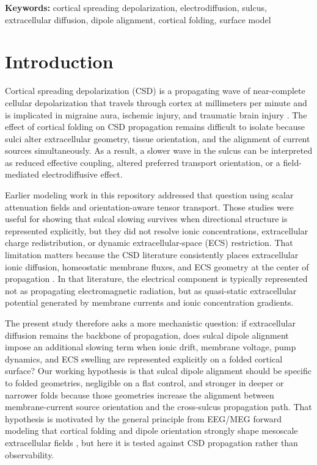 \documentclass[12pt]{article}
\begin{document}
\begin{abstract}
which extracellular diffusion remains the backbone of propagation, while sulcal dipole alignment adds a measurable, geometry-specific electrodiffusive slowing term that survives beyond the synthetic strip.
\end{abstract}

\noindent \textbf{Keywords:} cortical spreading depolarization, electrodiffusion, sulcus, extracellular diffusion, dipole alignment, cortical folding, surface model

\section{Introduction}

Cortical spreading depolarization (CSD) is a propagating wave of near-complete cellular depolarization that travels through cortex at millimeters per minute and is implicated in migraine aura, ischemic injury, and traumatic brain injury \citep{Pietrobon2014,Ayata2015,Woitzik2013,Dreier2017}. The effect of cortical folding on CSD propagation remains difficult to isolate because sulci alter extracellular geometry, tissue orientation, and the alignment of current sources simultaneously. As a result, a slower wave in the sulcus can be interpreted as reduced effective coupling, altered preferred transport orientation, or a field-mediated electrodiffusive effect.

Earlier modeling work in this repository addressed that question using scalar attenuation fields and orientation-aware tensor transport. Those studies were useful for showing that sulcal slowing survives when directional structure is represented explicitly, but they did not resolve ionic concentrations, extracellular charge redistribution, or dynamic extracellular-space (ECS) restriction. That limitation matters because the CSD literature consistently places extracellular ionic diffusion, homeostatic membrane fluxes, and ECS geometry at the center of propagation \citep{Tuckwell1978,Wei2014,Zandt2015}. In that literature, the electrical component is typically represented not as propagating electromagnetic radiation, but as quasi-static extracellular potential generated by membrane currents and ionic concentration gradients.

The present study therefore asks a more mechanistic question: if extracellular diffusion remains the backbone of propagation, does sulcal dipole alignment impose an additional slowing term when ionic drift, membrane voltage, pump dynamics, and ECS swelling are represented explicitly on a folded cortical surface? Our working hypothesis is that sulcal dipole alignment should be specific to folded geometries, negligible on a flat control, and stronger in deeper or narrower folds because those geometries increase the alignment between membrane-current source orientation and the cross-sulcus propagation path. That hypothesis is motivated by the general principle from EEG/MEG forward modeling that cortical folding and dipole orientation strongly shape mesoscale extracellular fields \citep{Ahlfors2010a,Ahlfors2010b,Muller2023,Reimann2022}, but here it is tested against CSD propagation rather than observability.
\end{document}
